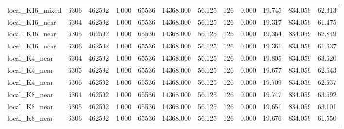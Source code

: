 \begin{tabular}{lrrrrrrrrrrr}
local\_K16\_mixed & 6306 & 462592 & 1.000 & 65536 & 14368.000 & 56.125 & 126 & 0.000 & 19.745 & 834.059 & 62.313 \\
local\_K16\_near & 6304 & 462592 & 1.000 & 65536 & 14368.000 & 56.125 & 126 & 0.000 & 19.317 & 834.059 & 61.475 \\
local\_K16\_near & 6305 & 462592 & 1.000 & 65536 & 14368.000 & 56.125 & 126 & 0.000 & 19.364 & 834.059 & 62.849 \\
local\_K16\_near & 6306 & 462592 & 1.000 & 65536 & 14368.000 & 56.125 & 126 & 0.000 & 19.361 & 834.059 & 61.637 \\
local\_K4\_near & 6304 & 462592 & 1.000 & 65536 & 14368.000 & 56.125 & 126 & 0.000 & 19.805 & 834.059 & 63.620 \\
local\_K4\_near & 6305 & 462592 & 1.000 & 65536 & 14368.000 & 56.125 & 126 & 0.000 & 19.677 & 834.059 & 62.643 \\
local\_K4\_near & 6306 & 462592 & 1.000 & 65536 & 14368.000 & 56.125 & 126 & 0.000 & 19.709 & 834.059 & 62.537 \\
local\_K8\_near & 6304 & 462592 & 1.000 & 65536 & 14368.000 & 56.125 & 126 & 0.000 & 19.747 & 834.059 & 63.692 \\
local\_K8\_near & 6305 & 462592 & 1.000 & 65536 & 14368.000 & 56.125 & 126 & 0.000 & 19.651 & 834.059 & 63.101 \\
local\_K8\_near & 6306 & 462592 & 1.000 & 65536 & 14368.000 & 56.125 & 126 & 0.000 & 19.676 & 834.059 & 61.550 \\
\bottomrule
\end{tabular}
